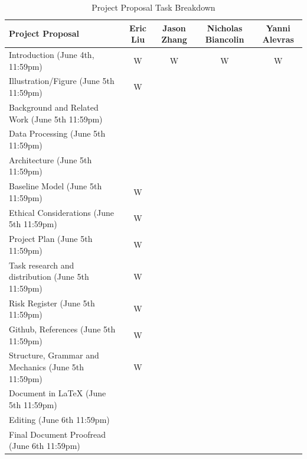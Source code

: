 \documentclass{article} %
\begin{document}
\begin{table}[ht]
    \centering
    \begin{tabular}{|l|c|c|c|c|}
        \hline
        \rowcolor{gray!50}
        \textbf{Project Proposal} & \textbf{Eric Liu} & \textbf{Jason Zhang} & \textbf{Nicholas Biancolin} & \textbf{Yanni Alevras} \\
        \hline
        \rowcolor{green!50}
        Introduction (June 4th, 11:59pm) & W & W & W & W \\
        \hline
        \rowcolor{green!50}
        Illustration/Figure (June 5th 11:59pm) & W & & & \\
        \hline
        \rowcolor{green!50}
        Background and Related Work (June 5th 11:59pm) & & & & \\
        \hline
        \rowcolor{green!50}
        Data Processing (June 5th 11:59pm) & & & & \\
        \hline
        \rowcolor{green!50}
        Architecture (June 5th 11:59pm) & & & & \\
        \hline
        \rowcolor{green!50}
        Baseline Model (June 5th 11:59pm) & W & & & \\
        \hline
        \rowcolor{green!50}
        Ethical Considerations (June 5th 11:59pm) & W & & & \\
        \hline
        \rowcolor{green!50}
        Project Plan (June 5th 11:59pm) & W & & & \\
        \hline
        \rowcolor{green!50}
        Task research and distribution (June 5th 11:59pm) & W & & & \\
        \hline
        \rowcolor{green!50}
        Risk Register (June 5th 11:59pm) & W & & & \\
        \hline
        \rowcolor{green!50}
        Github, References (June 5th 11:59pm) & W & & & \\
        \hline
        \rowcolor{green!50}
        Structure, Grammar and Mechanics (June 5th 11:59pm) & W & & & \\
        \hline
        \rowcolor{green!50}
        Document in LaTeX (June 5th 11:59pm) & & & & \\
        \hline
        \rowcolor{yellow!50}
        Editing (June 6th 11:59pm) & & & & \\
        \hline
        Final Document Proofread (June 6th 11:59pm) & & & & \\
        \hline
    \end{tabular}
    \caption{Project Proposal Task Breakdown}
\end{table}
\end{document}
